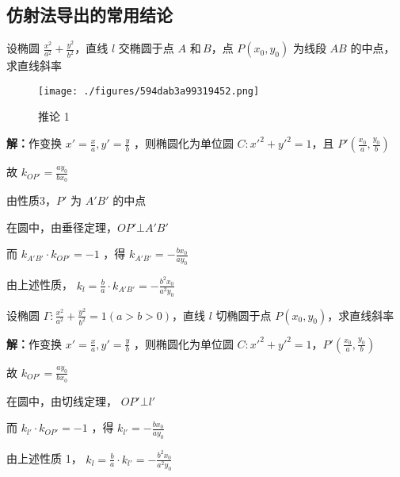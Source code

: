 \subsection{仿射法导出的常用结论}
\begin{corollary}{}
设椭圆 $\displaystyle{\frac{x^2}{a^2}+\frac{y^2}{b^2}}$，直线 $\displaystyle{l}$ 交椭圆于点 $\displaystyle{A}$ 和\,$\displaystyle{B}$，点 $\displaystyle{P(x_0,y_0)}$ 为线段 $\displaystyle{AB}$ 的中点，求直线斜率
\begin{figure}[ht]
\centering
\texttt{[image: ./figures/594dab3a99319452.png]}
\caption{推论 1} \label{fig_affine_1}
\end{figure}

\textbf{解：}作变换 $\displaystyle{x'=\frac{x}{a},y'=\frac{y}{b}}$ ，则椭圆化为单位圆 $\displaystyle{C:x'^2+y'^2=1}$，且 $\displaystyle{P'\left(\frac{x_0}{a},\frac{y_0}{b}\right)}$

故 $\displaystyle{k_{OP'}=\frac{ay_0}{bx_0}}$

由性质3，$\displaystyle{P'}$ 为 $\displaystyle{A'B'}$ 的中点

在圆中，由垂径定理，$\displaystyle{OP'\bot A'B'}$

而 $\displaystyle{k_{A'B'}\cdot k_{OP'}=-1}$ ，得 $\displaystyle{k_{A'B'}=-\frac{bx_0}{ay_0}}$

由上述性质， $\displaystyle{k_l=\frac{b}{a}\cdot k_{A'B'}=-\frac{b^2x_0}{a^2y_0}}$
\end{corollary}
\begin{corollary}{}
设椭圆   $\displaystyle{\Gamma:\frac{x^2}{a^2}+\frac{y^2}{b^2}=1(a>b>0)}$，直线 $\displaystyle{l}$ 切椭圆于点 $\displaystyle{P(x_0,y_0)}$，求直线斜率 

\textbf{解：}作变换 $\displaystyle{x'=\frac{x}{a},y'=\frac{y}{b}}$ ，则椭圆化为单位圆 $\displaystyle{C:x'^2+y'^2=1}$，$\displaystyle{P'\left(\frac{x_0}{a},\frac{y_0}{b}\right)}$ 

故  $\displaystyle{k_{OP'}=\frac{ay_0}{bx_0}}$ 

在圆中，由切线定理， $\displaystyle{OP'\bot l'}$ 

而  $\displaystyle{k_{l'}\cdot k_{OP'}=-1}$ ，得 $\displaystyle{k_{l'}=-\frac{bx_0}{ay_0}}$ 

由上述性质 1， $\displaystyle{k_l=\frac{b}{a}\cdot k_{l'}=-\frac{b^2x_0}{a^2y_0}}$ 

\end{corollary}

